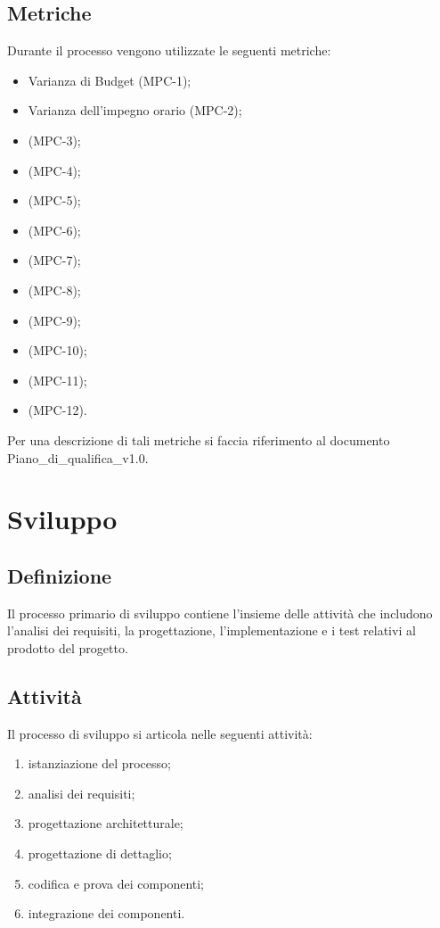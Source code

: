\subsection{Metriche}
Durante il processo vengono utilizzate le seguenti metriche:
\begin{itemize}
    \item Varianza di Budget (MPC-1);
    \item Varianza dell'impegno orario (MPC-2);
    \item {} (MPC-3);
    \item {} (MPC-4);
    \item {} (MPC-5);
    \item {} (MPC-6);
    \item {} (MPC-7);
    \item {} (MPC-8);
    \item {} (MPC-9);
    \item {} (MPC-10);
    \item {} (MPC-11);
    \item {} (MPC-12).
\end{itemize}
Per una descrizione di tali metriche si faccia riferimento al documento Piano\_di\_qualifica\_v1.0.

\newpage

\section{Sviluppo} \label{sec:sviluppo}
\subsection{Definizione}
Il processo primario di sviluppo contiene l'insieme delle attività che includono l'analisi dei requisiti, la progettazione, l'implementazione e i test relativi al prodotto del progetto.

\subsection{Attività}
Il processo di sviluppo si articola nelle seguenti attività:
\begin{enumerate}
    \item istanziazione del processo;
    \item analisi dei requisiti;
    \item progettazione architetturale;
    \item progettazione di dettaglio;
    \item codifica e prova dei componenti;
    \item integrazione dei componenti.
\end{enumerate}
